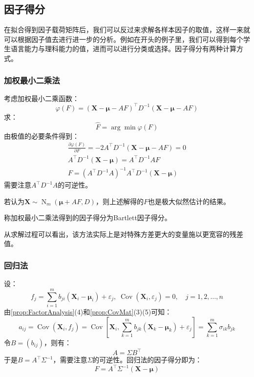 \subsection{因子得分}
在拟合得到因子载荷矩阵后，我们可以反过来求解各样本因子的取值，这样一来就可以根据因子值去进行进一步的分析。例如在开头的例子里，我们可以得到每个学生语言能力与理科能力的值，进而可以进行分类或选择。因子得分有两种计算方式。
\subsubsection{加权最小二乘法}
\begin{derivation}
	考虑加权最小二乘函数：
	\begin{equation*}
		\varphi(F)=(\mathbf{X}-\boldsymbol{\mu}-AF)^{\top}D^{-1}(\mathbf{X}-\boldsymbol{\mu}-AF)
	\end{equation*}
	求：
	\begin{equation*}
		\hat{F}=\arg\min\varphi(F)
	\end{equation*}
	由极值的必要条件得到：
	\begin{gather*}
		\frac{\partial\varphi(F)}{\partial F}=-2A^{\top}D^{-1}(\mathbf{X}-\boldsymbol{\mu}-AF)=0 \\
		A^{\top}D^{-1}(\mathbf{X}-\boldsymbol{\mu})=A^{\top}D^{-1}AF \\
		F=(A^{\top}D^{-1}A)^{-1}A^{\top}D^{-1}(\mathbf{X}-\boldsymbol{\mu})
	\end{gather*}
	需要注意$A^{\top}D^{-1}A$的可逆性。\par
	若认为$\mathbf{X}\sim\operatorname{N}_m(\boldsymbol{\mu}+AF,D)$，则上述解得的$F$也是极大似然估计的结果。
\end{derivation}
\begin{definition}
	称加权最小二乘法得到的因子得分为Bartlett因子得分。
\end{definition}
从求解过程可以看出，该方法实际上是对特殊方差更大的变量施以更宽容的残差值。

\subsubsection{回归法}
\begin{derivation}
	设：
	\begin{equation*}
		f_j=\sum_{i=1}^{m}b_{ji}(\mathbf{X}_i-\boldsymbol{\mu}_i)+\varepsilon_j,\;\operatorname{Cov}(\mathbf{X}_i,\varepsilon_j)=0,\quad j=1,2,\dots,n
	\end{equation*}
	由\cref{prop:FactorAnalysis}(4)和\cref{prop:CovMat}(3)(5)可知：
	\begin{equation*}
		a_{ij}=\operatorname{Cov}(\mathbf{X}_i,f_j)=\operatorname{Cov}\left[\mathbf{X}_i,\sum_{k=1}^{m}b_{jk}(\mathbf{X}_k-\boldsymbol{\mu}_k)+\varepsilon_j\right]=\sum_{k=1}^{m}\sigma_{ik}b_{jk}
	\end{equation*}
	令$B=(b_{ij})$，则有：
	\begin{equation*}
		A=\Sigma B^{\top}
	\end{equation*}
	于是$B=A^{\top}\Sigma^{-1}$，需要注意$\Sigma$的可逆性。回归法的因子得分即为：
	\begin{equation*}
		F=A^{\top}\Sigma^{-1}(\mathbf{X}-\boldsymbol{\mu})	
	\end{equation*}
\end{derivation}
